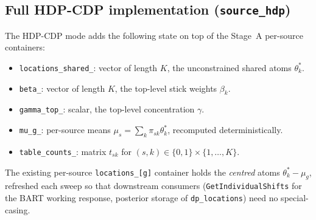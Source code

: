\documentclass[11pt]{article}
\theoremstyle{plain}
\theoremstyle{definition}
\theoremstyle{remark}
\newcommand{\1}{\mathds{1}}
\begin{document}
\subsection{Full HDP-CDP implementation (\texttt{source\_hdp})}\label{sec:impl-hdp}

The HDP-CDP mode adds the following state on top of the Stage~A per-source containers:

\begin{itemize}[noitemsep]
  \item \texttt{locations\_shared\_}: vector of length $K$, the unconstrained shared atoms $\theta^*_k$.
  \item \texttt{beta\_}: vector of length $K$, the top-level stick weights $\beta_k$.
  \item \texttt{gamma\_top\_}: scalar, the top-level concentration $\gamma$.
  \item \texttt{mu\_g\_}: per-source means $\mu_s = \sum_k \pi_{sk}\theta^*_k$, recomputed deterministically.
  \item \texttt{table\_counts\_}: matrix $t_{sk}$ for $(s, k) \in \{0,1\} \times \{1,\ldots,K\}$.
\end{itemize}
The existing per-source \texttt{locations\_[g]} container holds the \emph{centred} atoms $\theta^*_k - \mu_g$, refreshed each sweep so that downstream consumers (\texttt{GetIndividualShifts} for the BART working response, posterior storage of \texttt{dp\_locations}) need no special-casing.
\end{document}
